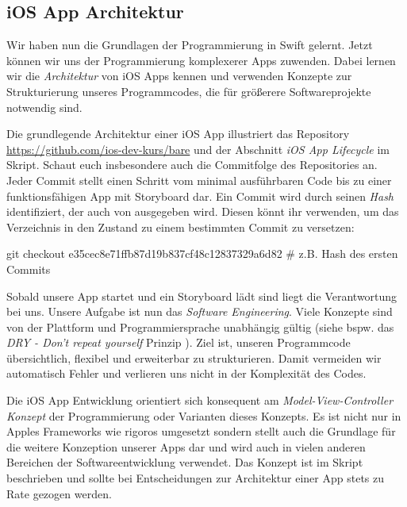 \documentclass[parskip=half, final]{scrreprt}
\begin{document}
\begin{lecture} %


\chapter{iOS App Architektur}

Wir haben nun die Grundlagen der Programmierung in Swift gelernt. Jetzt können wir uns der Programmierung komplexerer Apps zuwenden. Dabei lernen wir die \emph{Architektur} von iOS Apps kennen und verwenden Konzepte zur Strukturierung unseres Programmcodes, die für größerere Softwareprojekte notwendig sind.

Die grundlegende Architektur einer iOS App illustriert das Repository \url{https://github.com/ios-dev-kurs/bare} und der Abschnitt \emph{iOS App Lifecycle} im Skript. Schaut euch insbesondere auch die Commitfolge  des Repositories an. Jeder Commit stellt einen Schritt vom minimal ausführbaren Code bis zu einer funktionsfähigen App mit Storyboard dar. Ein Commit wird durch seinen \emph{Hash} identifiziert, der auch von  ausgegeben wird. Diesen könnt ihr verwenden, um das Verzeichnis in den Zustand zu einem bestimmten Commit zu versetzen:
\begin{shcode}
git checkout e35cec8e71ffb87d19b837cf48c12837329a6d82 # z.B. Hash des ersten Commits
\end{shcode}

Sobald unsere App startet und ein Storyboard lädt sind liegt die Verantwortung bei uns. Unsere Aufgabe ist nun das \emph{Software Engineering}. Viele Konzepte sind von der Plattform und Programmiersprache unabhängig gültig (siehe bspw. das \emph{DRY - Don't repeat yourself} Prinzip ). Ziel ist, unseren Programmcode übersichtlich, flexibel und erweiterbar zu strukturieren. Damit vermeiden wir automatisch Fehler und verlieren uns nicht in der Komplexität des Codes.

Die iOS App Entwicklung orientiert sich konsequent am \emph{Model-View-Controller Konzept} der Programmierung oder Varianten dieses Konzepts. Es ist nicht nur in Apples Frameworks wie  rigoros umgesetzt sondern stellt auch die Grundlage für die weitere Konzeption unserer Apps dar und wird auch in vielen anderen Bereichen der Softwareentwicklung verwendet. Das Konzept ist im Skript beschrieben und sollte bei Entscheidungen zur Architektur einer App stets zu Rate gezogen werden.


\end{lecture}
\end{document}
